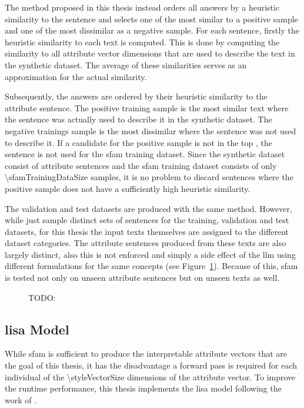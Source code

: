 The method proposed in this thesis instead orders all answers by a heuristic similarity to the sentence and selects one of the most similar to a positive sample and one of the most dissimilar as a negative sample. For each sentence, firstly the heuristic similarity to each text is computed. This is done by computing the similarity to all attribute vector dimensions that are used to describe the text in the synthetic dataset. The average of these similarities serves as an approximation for the actual similarity.

Subsequently, the answers are ordered by their heuristic similarity to the attribute sentence. The positive training sample is the most similar text where the sentence was actually used to describe it in the synthetic dataset. The negative trainings sample is the most dissimilar where the sentence was not used to describe it. If a candidate for the positive sample is not in the top \sfamDataTopPercentText{}, the sentence is not used for the \ac{sfam} training dataset. %
Since the synthetic dataset consist of \numStyleSentencesText{} attribute sentences and the \ac{sfam} training dataset consists of only \num{\sfamTrainingDataSize} samples, it is no problem to discard sentences where the positive sample does not have a sufficiently high heuristic similarity.

The validation and test datasets are produced with the same method. However, while \citet{patelLearningInterpretableStyle2023} just sample distinct sets of sentences for the training, validation and test datasets, for this thesis the input texts themselves are assigned to the different dataset categories. The attribute sentences produced from these texts are also largely distinct, also this is not enforced and simply a side effect of the \ac{llm} using different formulations for the same concepts (see Figure~\ref{fig:sfamDatasetSplit}).
Because of this, \ac{sfam} is tested not only on unseen attribute sentences but on unseen texts as well.

\begin{figure}[ht]
  \begin{center}
    
  \end{center}
  \caption{TODO:}
  \label{fig:sfamDatasetSplit}
\end{figure}


\subsection{\acf{lisa} Model}
\label{sec:experiments:setup:lisa}
While \ac{sfam} is sufficient to produce the interpretable attribute vectors that are the goal of this thesis, it has the disadvantage a forward pass is required for each individual of the \num{\styleVectorSize} dimensions of the attribute vector. To improve the runtime performance, this thesis implements the \ac{lisa} model following the work of \citet{patelLearningInterpretableStyle2023}.

